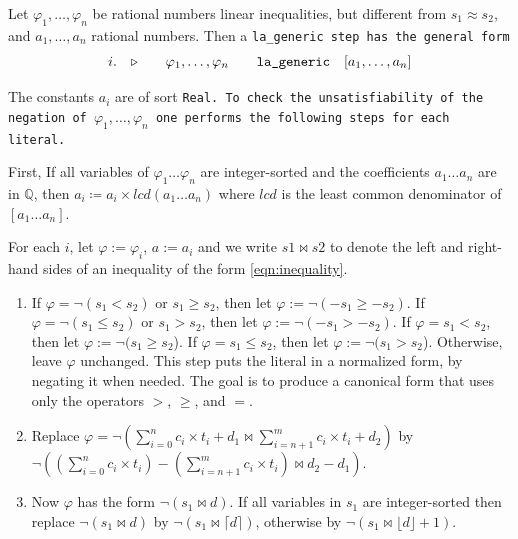 \begin{algorithm}[!t]%
\caption{la\_generic rule}\label{alg:la-generic-description}
Let $\varphi_1,\dots, \varphi_n$ be rational numbers linear inequalities, but different from $s_1 \approx s_2$, and $a_1, \dots, a_n$ rational numbers. Then a \tt{la\_generic} step has the general form
%
\[
\begin{matrix*}[c]
  i. & \ctxsep \quad & \varphi_1 , \dots , \varphi_n & \quad \tt{la\_generic}  & [a_1, \dots, a_n] \\
\end{matrix*}
\]

The constants $a_i$ are of sort \tt{Real}. To check the unsatisfiability of the negation of $\varphi_1, \dots, \varphi_n$ one performs the following steps for each literal.

First, If all variables of $\varphi_1 \dots \varphi_n$ are integer-sorted and the coefficients $a_1 \dots a_n$ are in $\mathbb{Q}$,
then $a_i \coloneq a_i \times \mathit{lcd}(a_1 \dots a_n)$ where $\mathit{lcd}$ is the least common denominator of $[a_1 \dots a_n]$.

For each $i$, let $\varphi := \varphi_i$, $a := a_i$ and
we write $s1 \bowtie s2$ to denote the left and right-hand sides of an inequality of the form \eqref{eqn:inequality}.


\begin{enumerate}
    \item If $\varphi =  \neg (s_1 < s_2)$  or $s_1 \geq s_2$, then let $\varphi := \neg(- s_1 \geq - s_2)$.
    If $\varphi =  \neg (s_1 \leq s_2)$ or $s_1 > s_2$, then let $\varphi := \neg(- s_1 > - s_2)$.
    If $\varphi = s_1 < s_2$, then let $\varphi := \neg(s_1 \geq s_2$).
    If $\varphi = s_1 \leq s_2$, then let $\varphi := \neg(s_1 > s_2$).
    Otherwise, leave $\varphi$ unchanged.
    This step puts the literal in a normalized form, by negating it when needed.
    The goal is to produce a canonical form that uses only the operators $>$, $\geq$, and $=$.


    \item Replace $\varphi = \neg (\sum_{i=0}^{n}c_i\times{}t_i + d_1 \bowtie \sum_{i=n+1}^{m} c_i\times{}t_i + d_2)$ by $\neg (\left(\sum_{i=0}^{n}c_i\times{}t_i\right) - \left(\sum_{i=n+1}^{m} c_i\times{}t_i\right)
    \bowtie d_2 - d_1)$.

    \item \label{la_generic:str}Now $\varphi$ has the form $\neg (s_1 \bowtie d)$. If all
    variables in $s_1$ are integer-sorted then replace $\neg (s_1 \bowtie d)$ by $\neg (s_1 \bowtie \lceil d \rceil)$,
    otherwise by $\neg (s_1 \bowtie \lfloor d\rfloor + 1)$.


\end{enumerate}
\end{algorithm}
